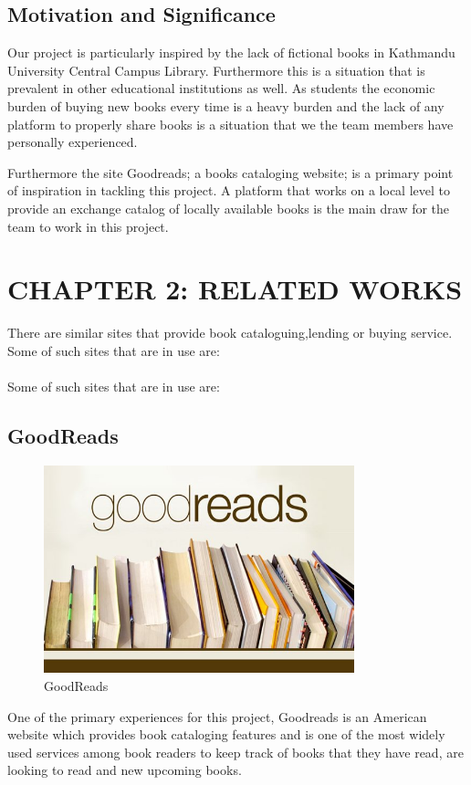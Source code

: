\documentclass[12pt]{article}
\begin{document}
\vspace*{5mm}
\subsection{Motivation and Significance}
Our project is particularly inspired by the lack of fictional books in Kathmandu 
University Central Campus Library. Furthermore this is a situation that is prevalent 
in other educational institutions as well. As students the economic burden of buying 
new books every time is a heavy burden and the lack of any platform to properly share 
books is a situation that we the team members have personally experienced.

Furthermore the site Goodreads; a books cataloging website; is a primary point of 
inspiration in tackling this project. A platform that works on a local level to 
provide an exchange catalog of locally available books is the main draw for the 
team to work in this project.

\clearpage

\section{CHAPTER 2: RELATED WORKS}
There are similar sites that provide book cataloguing,lending or buying service. Some of such sites that
are in use are:
\\\\
Some of such sites that are in use are:

\subsection{GoodReads}
\begin{figure}[h]
    \centerline{\includegraphics[width = 90mm]{goodreads.jpg}}
    \caption{GoodReads}
    \label{fig}
\end{figure}
One of the primary experiences for this project, Goodreads is an American website 
which provides book cataloging features and is one of the most widely used services 
among book readers to keep track of books that they have read, are looking to read 
and new upcoming books.
\vspace{10mm}
\clearpage
\end{document}
